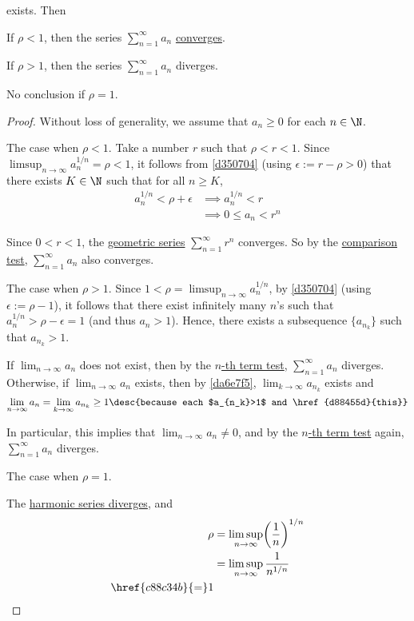 exists. Then
\begin{enumerati}
  \item If $\rho<1$, then the series $\sum_{n=1}^\infty a_n$
        \href{f8901df}{converges}.
  \item If $\rho>1$, then the series $\sum_{n=1}^\infty a_n$ diverges.
  \item No conclusion if $\rho=1$.
\end{enumerati}

\begin{proof}
  Without loss of generality, we assume that $a_n\geq0$ for each $n\in\N$.

   The case when $\rho<1$. Take a number $r$ such that $\rho<r<1$.
  Since $\limsup_{n\to\infty}a^{1/n}_n=\rho<1$, it follows from
  \autoref{d350704} (using $\epsilon:=r-\rho>0$) that there exists $K\in\N$ such
  that for all $n\geq K$,
  \begin{align*}
    a^{1/n}_n<\rho+\epsilon
     &\implies a^{1/n}_n<r   \\
     &\implies 0\leq a_n<r^n
  \end{align*}

  Since $0<r<1$, the \href{fca26f6}{geometric series} $\sum_{n=1}^\infty r^n$
  converges. So by the \href{d0856d6}{comparison test}, $\sum_{n=1}^\infty a_n$
  also converges.

   The case when $\rho>1$. Since
  $1<\rho=\limsup_{n\to\infty}a^{1/n}_n$, by \autoref{d350704} (using
  $\epsilon:=\rho-1$), it follows that there exist infinitely many $n$'s such
  that $a^{1/n}_n>\rho-\epsilon=1$ (and thus $a_n>1$). Hence, there exists a
  subsequence $\{a_{n_k}\}$ such that $a_{n_k}>1$.

  If $\lim_{n\to\infty}a_n$ does not exist, then by the \href{fa993a6}{$n$-th
  term test}, $\sum_{n=1}^\infty a_n$ diverges. Otherwise, if
  $\lim_{n\to\infty}a_n$ exists, then by \autoref{da6e7f5},
  $\lim_{k\to\infty}a_{n_k}$ exists and
  $$
    \lim_{n\to\infty}a_n=\lim_{k\to\infty}a_{n_k}\geq1\desc{because each $a_{n_k}>1$ and \href{d88455d}{this}}
  $$

  In particular, this implies that $\lim_{n\to\infty}a_n\neq0$, and by the
  \href{fa993a6}{$n$-th term test} again, $\sum_{n=1}^\infty a_n$ diverges.

   The case when $\rho=1$.

  The \href{ffaeb85}{harmonic series diverges}, and
  \begin{align*}
    \rho
     &=\limsup_{n\to\infty}\biggl(\frac1n\biggr)^{1/n} \\
     &=\limsup_{n\to\infty}\frac1{n^{1/n}}             \\
    \href{c88c34b}{=}1
  \end{align*}


\end{proof}
